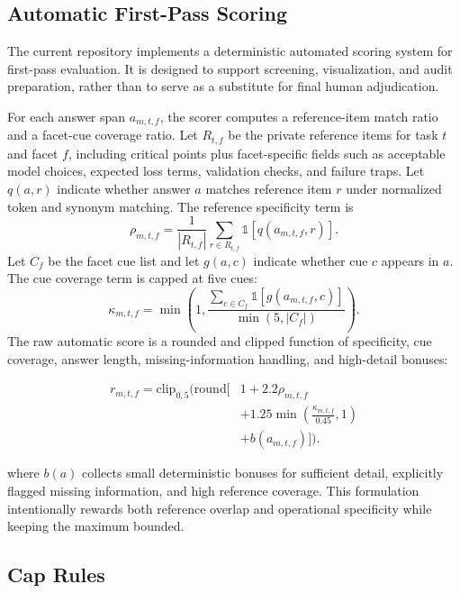 \documentclass[11pt]{article}
\begin{document}
\subsection{Automatic First-Pass Scoring}

The current repository implements a deterministic automated scoring system for first-pass evaluation. It is designed to support screening, visualization, and audit preparation, rather than to serve as a substitute for final human adjudication.

For each answer span $a_{m,t,f}$, the scorer computes a reference-item match ratio and a facet-cue coverage ratio. Let $R_{t,f}$ be the private reference items for task $t$ and facet $f$, including critical points plus facet-specific fields such as acceptable model choices, expected loss terms, validation checks, and failure traps. Let $q(a,r)$ indicate whether answer $a$ matches reference item $r$ under normalized token and synonym matching. The reference specificity term is
\begin{equation}
\rho_{m,t,f} =
\frac{1}{|R_{t,f}|}\sum_{r \in R_{t,f}} \mathbb{1}[q(a_{m,t,f}, r)] .
\end{equation}
Let $C_f$ be the facet cue list and let $g(a,c)$ indicate whether cue $c$ appears in $a$. The cue coverage term is capped at five cues:
\begin{equation}
\kappa_{m,t,f} =
\min\left(1, \frac{\sum_{c \in C_f} \mathbb{1}[g(a_{m,t,f},c)]}{\min(5,|C_f|)}\right).
\end{equation}
The raw automatic score is a rounded and clipped function of specificity, cue coverage, answer length, missing-information handling, and high-detail bonuses:

\begin{equation}
\begin{aligned}
r_{m,t,f}
= \mathrm{clip}_{0,5}\Bigg(
\mathrm{round}\Big[
&1 + 2.2\rho_{m,t,f} \\
&+ 1.25\min\left(\frac{\kappa_{m,t,f}}{0.45},1\right) \\
&+ b(a_{m,t,f})
\Big]\Bigg).
\end{aligned}
\end{equation}


where $b(a)$ collects small deterministic bonuses for sufficient detail, explicitly flagged missing information, and high reference coverage. This formulation intentionally rewards both reference overlap and operational specificity while keeping the maximum bounded.

\subsection{Cap Rules}
\end{document}
